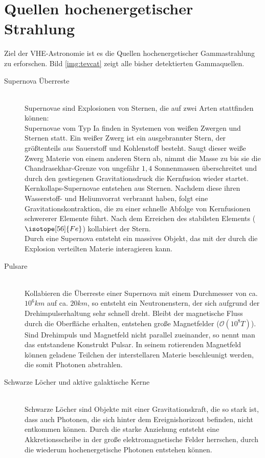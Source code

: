 \section{Quellen hochenergetischer Strahlung}
Ziel der VHE-Astronomie ist es die Quellen hochenergetischer Gammastrahlung zu erforschen. Bild \ref{img:tevcat} zeigt alle bisher detektierten Gammaquellen.
\begin{description}
\item[Supernova Überreste]\hfill \\
Supernovae sind Explosionen von Sternen, die auf zwei Arten stattfinden können:\\Supernovae vom Typ Ia finden in Systemen von weißen Zwergen und Sternen statt. Ein weißer Zwerg ist ein ausgebrannter Stern, der größtenteils aus Sauerstoff und Kohlenstoff besteht. Saugt dieser weiße Zwerg Materie von einem anderen Stern ab, nimmt die Masse zu bis sie die Chandrasekhar-Grenze von ungefähr $1,4$ Sonnenmassen \cite{Grupen} überschreitet und durch den gestiegenen Gravitationsdruck die Kernfusion wieder startet.\\Kernkollaps-Supernovae entstehen aus Sternen. Nachdem diese ihren Wasserstoff- und Heliumvorrat verbrannt haben, folgt eine Gravitationskontraktion, die zu einer schnelle Abfolge von Kernfusionen schwererer Elemente führt. Nach dem Erreichen des stabilsten Elements ($\isotope[56]{Fe}$) kollabiert der Stern.\\Durch eine Supernova entsteht ein massives Objekt, das mit der durch die Explosion verteilten Materie interagieren kann.
\item[Pulsare]\hfill \\
Kollabieren die Überreste einer Supernova mit einem Durchmesser von ca. $10^6\unit{km}$ auf ca. $20\unit{km}$, so entsteht ein Neutronenstern, der sich aufgrund der Drehimpulserhaltung sehr schnell dreht. Bleibt der magnetische Fluss durch die Oberfläche erhalten, entstehen große Magnetfelder ($\mathcal{O}(10^8\unit{T})$\cite{Grupen}). Sind Drehimpuls und Magnetfeld nicht parallel zueinander, so nennt man das entstandene Konstrukt Pulsar. In seinem rotierenden Magnetfeld können geladene Teilchen der interstellaren Materie beschleunigt werden, die somit Photonen abstrahlen.
\item[Schwarze Löcher und aktive galaktische Kerne]\hfill \\
Schwarze Löcher sind Objekte mit einer Gravitationskraft, die so stark ist, dass auch Photonen, die sich hinter dem Ereignishorizont befinden, nicht entkommen können. Durch die starke Anziehung entsteht eine Akkretionsscheibe in der große elektromagnetische Felder herrschen, durch die wiederum hochenergetische Photonen entstehen können.

\end{description}
